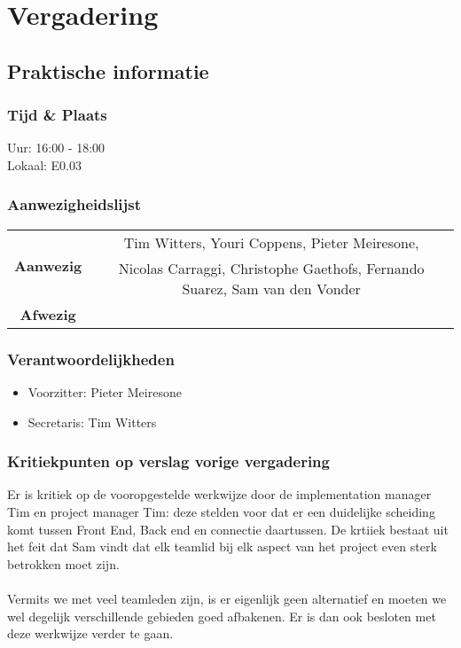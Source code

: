 \section{Vergadering \MeetingDate}
\subsection{Praktische informatie}
\subsubsection{Tijd \& Plaats}
Uur: 16:00 - 18:00
\\
Lokaal: E0.03
\subsubsection{Aanwezigheidslijst}
\begin{table}[htbp]
	\centering
	\begin{tabular}{c|c}
		\multirow{2}{*}{\textbf{Aanwezig}} & Tim Witters, Youri Coppens, Pieter Meiresone, \\
		& Nicolas Carraggi,  Christophe Gaethofs, Fernando Suarez, Sam van den Vonder \\
		\hline
		\textbf{Afwezig} & \\
	\end{tabular}
\end{table}

\subsubsection{Verantwoordelijkheden}
\begin{itemize}
	\item Voorzitter: Pieter Meiresone
	\item Secretaris: Tim Witters
\end{itemize}

\subsubsection{Kritiekpunten op verslag vorige vergadering}
Er is kritiek op de vooropgestelde werkwijze door de implementation manager Tim en project manager Tim: deze stelden voor dat er een duidelijke scheiding komt tussen Front End, Back end en connectie daartussen. De krtiiek bestaat uit het feit dat Sam vindt dat elk teamlid bij elk aspect van het project even sterk betrokken moet zijn. 
\\
\\
Vermits we met veel teamleden zijn, is er eigenlijk geen alternatief en moeten we wel degelijk verschillende gebieden goed afbakenen. Er is dan ook besloten met deze werkwijze verder te gaan.
